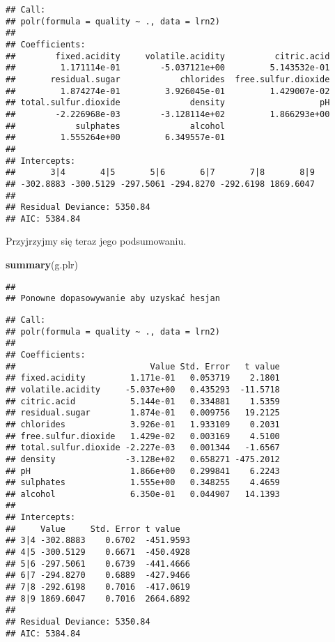 \documentclass[
]{article}
\newenvironment{Shaded}{\begin{snugshade}}{\end{snugshade}}
\newcommand{\FunctionTok}[1]{\textcolor[rgb]{0.13,0.29,0.53}{\textbf{#1}}}
\newcommand{\NormalTok}[1]{#1}
\begin{document}
\begin{verbatim}
## Call:
## polr(formula = quality ~ ., data = lrn2)
## 
## Coefficients:
##        fixed.acidity     volatile.acidity          citric.acid 
##         1.171114e-01        -5.037121e+00         5.143532e-01 
##       residual.sugar            chlorides  free.sulfur.dioxide 
##         1.874274e-01         3.926045e-01         1.429007e-02 
## total.sulfur.dioxide              density                   pH 
##        -2.226968e-03        -3.128114e+02         1.866293e+00 
##            sulphates              alcohol 
##         1.555264e+00         6.349557e-01 
## 
## Intercepts:
##       3|4       4|5       5|6       6|7       7|8       8|9 
## -302.8883 -300.5129 -297.5061 -294.8270 -292.6198 1869.6047 
## 
## Residual Deviance: 5350.84 
## AIC: 5384.84
\end{verbatim}

Przyjrzyjmy się teraz jego podsumowaniu.

\begin{Shaded}
\begin{Highlighting}[]
\FunctionTok{summary}\NormalTok{(g.plr)}
\end{Highlighting}
\end{Shaded}

\begin{verbatim}
## 
## Ponowne dopasowywanie aby uzyskać hesjan
\end{verbatim}

\begin{verbatim}
## Call:
## polr(formula = quality ~ ., data = lrn2)
## 
## Coefficients:
##                           Value Std. Error   t value
## fixed.acidity         1.171e-01   0.053719    2.1801
## volatile.acidity     -5.037e+00   0.435293  -11.5718
## citric.acid           5.144e-01   0.334881    1.5359
## residual.sugar        1.874e-01   0.009756   19.2125
## chlorides             3.926e-01   1.933109    0.2031
## free.sulfur.dioxide   1.429e-02   0.003169    4.5100
## total.sulfur.dioxide -2.227e-03   0.001344   -1.6567
## density              -3.128e+02   0.658271 -475.2012
## pH                    1.866e+00   0.299841    6.2243
## sulphates             1.555e+00   0.348255    4.4659
## alcohol               6.350e-01   0.044907   14.1393
## 
## Intercepts:
##     Value     Std. Error t value  
## 3|4 -302.8883    0.6702  -451.9593
## 4|5 -300.5129    0.6671  -450.4928
## 5|6 -297.5061    0.6739  -441.4666
## 6|7 -294.8270    0.6889  -427.9466
## 7|8 -292.6198    0.7016  -417.0619
## 8|9 1869.6047    0.7016  2664.6892
## 
## Residual Deviance: 5350.84 
## AIC: 5384.84
\end{verbatim}
\end{document}
